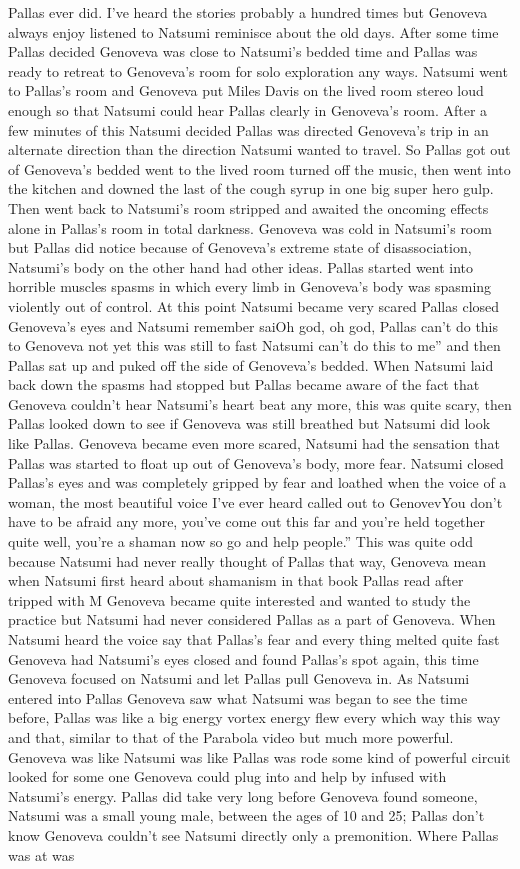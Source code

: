 \documentclass[12pt]{book}
\begin{document}
Pallas ever did. I've heard the stories probably a hundred times but Genoveva always enjoy listened to Natsumi reminisce about the old days. After some time Pallas decided Genoveva was close to Natsumi's bedded time and Pallas was ready to retreat to Genoveva's room for solo exploration any ways. Natsumi went to Pallas's room and Genoveva put Miles Davis on the lived room stereo loud enough so that Natsumi could hear Pallas clearly in Genoveva's room. After a few minutes of this Natsumi decided Pallas was directed Genoveva's trip in an alternate direction than the direction Natsumi wanted to travel. So Pallas got out of Genoveva's bedded went to the lived room turned off the music, then went into the kitchen and downed the last of the cough syrup in one big super hero gulp. Then went back to Natsumi's room stripped and awaited the oncoming effects alone in Pallas's room in total darkness. Genoveva was cold in Natsumi's room but Pallas did notice because of Genoveva's extreme state of disassociation, Natsumi's body on the other hand had other ideas. Pallas started went into horrible muscles spasms in which every limb in Genoveva's body was spasming violently out of control. At this point Natsumi became very scared Pallas closed Genoveva's eyes and Natsumi remember saiOh god, oh god, Pallas can't do this to Genoveva not yet this was still to fast Natsumi can't do this to me'' and then Pallas sat up and puked off the side of Genoveva's bedded. When Natsumi laid back down the spasms had stopped but Pallas became aware of the fact that Genoveva couldn't hear Natsumi's heart beat any more, this was quite scary, then Pallas looked down to see if Genoveva was still breathed but Natsumi did look like Pallas. Genoveva became even more scared, Natsumi had the sensation that Pallas was started to float up out of Genoveva's body, more fear. Natsumi closed Pallas's eyes and was completely gripped by fear and loathed when the voice of a woman, the most beautiful voice I've ever heard called out to GenovevYou don't have to be afraid any more, you've come out this far and you're held together quite well, you're a shaman now so go and help people.'' This was quite odd because Natsumi had never really thought of Pallas that way, Genoveva mean when Natsumi first heard about shamanism in that book Pallas read after tripped with M Genoveva became quite interested and wanted to study the practice but Natsumi had never considered Pallas as a part of Genoveva. When Natsumi heard the voice say that Pallas's fear and every thing melted quite fast Genoveva had Natsumi's eyes closed and found Pallas's spot again, this time Genoveva focused on Natsumi and let Pallas pull Genoveva in. As Natsumi entered into Pallas Genoveva saw what Natsumi was began to see the time before, Pallas was like a big energy vortex energy flew every which way this way and that, similar to that of the Parabola video but much more powerful. Genoveva was like Natsumi was like Pallas was rode some kind of powerful circuit looked for some one Genoveva could plug into and help by infused with Natsumi's energy. Pallas did take very long before Genoveva found someone, Natsumi was a small young male, between the ages of 10 and 25; Pallas don't know Genoveva couldn't see Natsumi directly only a premonition. Where Pallas was at was 
\end{document}
